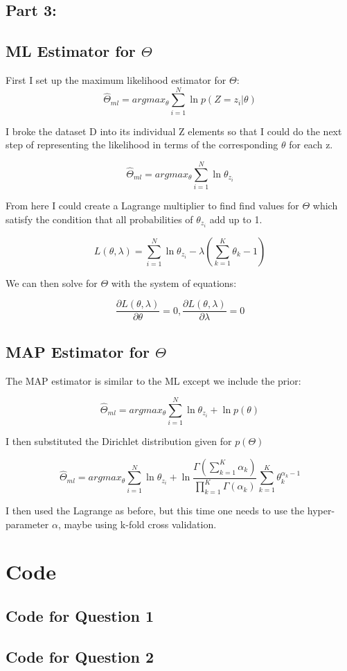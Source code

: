 \documentclass[11pt]{article}
\begin{document}
\subsection*{Part 3:}

\subsection*{ML Estimator for $\Theta$}
First I set up the maximum likelihood estimator for $\Theta$:
\[
	\hat{\Theta}_{ml} = argmax_{\theta} \sum_{i=1}^{N} \ln p(Z=z_i\vert \theta)
\]

I broke the dataset D into its individual Z elements so that I could do the next step of representing the likelihood in terms of the corresponding $\theta$ for each z.

\[
	\hat{\Theta}_{ml} = argmax_{\theta} \sum_{i=1}^{N} \ln \theta_{z_i}
\]

From here I could create a Lagrange multiplier to find find values for $\Theta$ which satisfy the condition that all probabilities of $\theta_{z_i}$
add up to 1.

\[
	L(\theta, \lambda) = \sum_{i=1}^{N} \ln \theta_{z_i} - \lambda(\sum_{k=1}^{K}\theta_k - 1)
\]

We can then solve for $\Theta$ with the system of equations:

\[
	\frac{\partial L(\theta, \lambda)}{\partial \theta} = 0,
	\frac{\partial L(\theta, \lambda)}{\partial \lambda} = 0 
\]

\subsection*{MAP Estimator for $\Theta$}
The MAP estimator is similar to the ML except we include the prior:

\[
	\hat{\Theta}_{ml} = argmax_{\theta} \sum_{i=1}^{N} \ln \theta_{z_i} + \ln p(\theta)
\]

I then substituted the Dirichlet distribution given for $p(\Theta)$

\[
	\hat{\Theta}_{ml} = argmax_{\theta} \sum_{i=1}^{N} \ln \theta_{z_i}
	+ \ln \frac{\Gamma(\sum_{k=1}^{K} \alpha_k)}{\prod_{k=1}^{K}\Gamma(\alpha_k)} \sum_{k=1}^{K} \theta_k^{\alpha_k -1}
\]

I then used the Lagrange as before, but this time one needs to use the hyper-parameter $\alpha$, maybe using k-fold cross validation.

\section*{Code}
\subsection*{Code for Question 1}


\subsection*{Code for Question 2}

\end{document}
